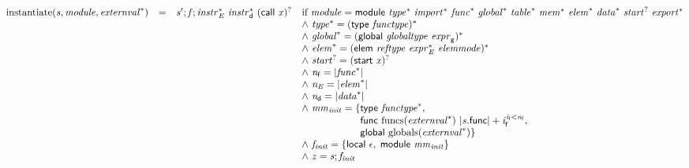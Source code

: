 $$
\begin{array}{@{}lcl@{}l@{}}
{\mathrm{instantiate}}({\mathit{s}}, {\mathit{module}}, {{\mathit{externval}}^\ast}) &=& {\mathit{s}'} ; {\mathit{f}} ; {{\mathit{instr}}_{{\mathit{E}}}^\ast}~{{\mathit{instr}}_{{\mathsf{d}}}^\ast}~{(\mathsf{call}~{\mathit{x}})^?} &\quad
  \mbox{if}~{\mathit{module}} = \mathsf{module}~{{\mathit{type}}^\ast}~{{\mathit{import}}^\ast}~{{\mathit{func}}^\ast}~{{\mathit{global}}^\ast}~{{\mathit{table}}^\ast}~{{\mathit{mem}}^\ast}~{{\mathit{elem}}^\ast}~{{\mathit{data}}^\ast}~{{\mathit{start}}^?}~{{\mathit{export}}^\ast} \\
 &&&\quad {\land}~{{\mathit{type}}^\ast} = {(\mathsf{type}~{\mathit{functype}})^\ast} \\
 &&&\quad {\land}~{{\mathit{global}}^\ast} = {(\mathsf{global}~{\mathit{globaltype}}~{\mathit{expr}}_{{\mathsf{g}}})^\ast} \\
 &&&\quad {\land}~{{\mathit{elem}}^\ast} = {(\mathsf{elem}~{\mathit{reftype}}~{{\mathit{expr}}_{{\mathit{E}}}^\ast}~{\mathit{elemmode}})^\ast} \\
 &&&\quad {\land}~{{\mathit{start}}^?} = {(\mathsf{start}~{\mathit{x}})^?} \\
 &&&\quad {\land}~{\mathit{n}}_{{\mathsf{f}}} = {|{{\mathit{func}}^\ast}|} \\
 &&&\quad {\land}~{\mathit{n}}_{{\mathit{E}}} = {|{{\mathit{elem}}^\ast}|} \\
 &&&\quad {\land}~{\mathit{n}}_{{\mathsf{d}}} = {|{{\mathit{data}}^\ast}|} \\
 &&&\quad {\land}~{\mathit{mm}}_{{\mathit{init}}} = \{ \begin{array}[t]{@{}l@{}}
\mathsf{type}~{{\mathit{functype}}^\ast},\; \\
  \mathsf{func}~{\mathrm{funcs}}({{\mathit{externval}}^\ast})~{{|{\mathit{s}}.\mathsf{func}|} + {\mathit{i}}_{{\mathsf{f}}}^{{\mathit{i}}_{{\mathsf{f}}}<{\mathit{n}}_{{\mathsf{f}}}}},\; \\
  \mathsf{global}~{\mathrm{globals}}({{\mathit{externval}}^\ast}) \}\end{array} \\
 &&&\quad {\land}~{\mathit{f}}_{{\mathit{init}}} = \{ \begin{array}[t]{@{}l@{}}
\mathsf{local}~\epsilon,\; \mathsf{module}~{\mathit{mm}}_{{\mathit{init}}} \}\end{array} \\
 &&&\quad {\land}~{\mathit{z}} = {\mathit{s}} ; {\mathit{f}}_{{\mathit{init}}} \\

\end{array}$$

